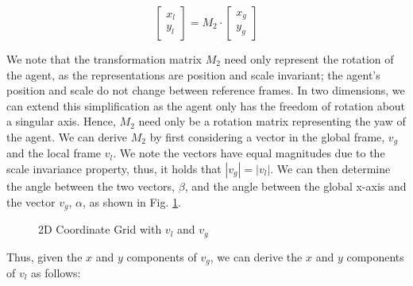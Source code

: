 \documentclass[12pt]{article}
\begin{document}
\begin{equation}
    \begin{bmatrix}
    x_l \\
    y_l
    \end{bmatrix}
    = M_2 \cdot
    \begin{bmatrix}
    x_g \\
    y_g
    \end{bmatrix}
\label{eq:basis-transformation2}
\end{equation}

We note that the transformation matrix $M_2$ need only represent the rotation of the agent, as the representations are position and scale invariant; the agent's position and scale do not change between reference frames. In two dimensions, we can extend this simplification as the agent only has the freedom of rotation about a singular axis. Hence, $M_2$ need only be a rotation matrix representing the yaw of the agent. We can derive $M_2$ by first considering a vector in the global frame, $v_g$ and the local frame $v_l$. We note the vectors have equal magnitudes due to the scale invariance property, thus, it holds that $|v_g| = |v_l|$. We can then determine the angle between the two vectors, $\beta$, and the angle between the global x-axis and the vector $v_g$, $\alpha$, as shown in Fig. \ref{fig:2d-rotation}.

\begin{figure}[ht]
    \centering
    \caption{2D Coordinate Grid with $v_l$ and $v_g$}
    \label{fig:2d-rotation}
\end{figure}

Thus, given the $x$ and $y$ components of $v_g$, we can derive the $x$ and $y$ components of $v_l$ as follows:
\end{document}
